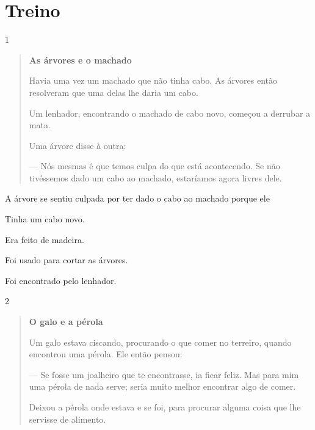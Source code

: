 \section*{Treino}

\num{1}

\begin{quote}
\textbf{As árvores e o machado}

Havia uma vez um machado que não tinha cabo.
As árvores então resolveram que uma delas lhe daria
um cabo.

Um lenhador, encontrando o machado de cabo novo,
começou a derrubar a mata.

Uma árvore disse à outra:

--- Nós mesmas é que temos culpa do que está
acontecendo. Se não tivéssemos dado um cabo ao machado,
estaríamos agora livres dele.

\end{quote}

A árvore se sentiu culpada por ter dado o cabo ao machado porque ele

\begin{escolha}
\item Tinha um cabo novo.

\item Era feito de madeira.

\item Foi usado para cortar as árvores.

\item Foi encontrado pelo lenhador.
\end{escolha}

\num{2}

\begin{quote}
\textbf{O galo e a pérola}

Um galo estava ciscando, procurando o que comer no terreiro,
quando encontrou uma pérola. Ele então pensou:

--- Se fosse um joalheiro que te encontrasse, ia ficar feliz.
Mas para mim uma pérola de nada serve; seria muito melhor
encontrar algo de comer.

Deixou a pérola onde estava e se foi, para procurar
alguma coisa que lhe servisse de alimento.

\end{quote}

